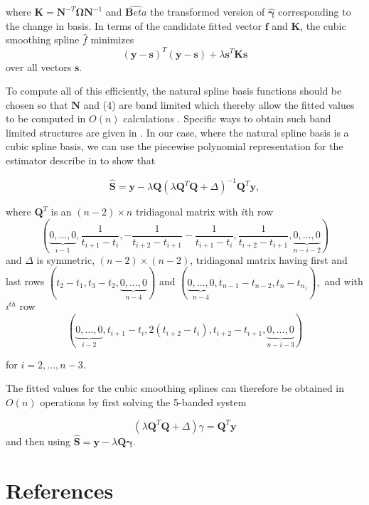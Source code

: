 \documentclass[]{book}
\begin{document}
where \(\mathbf{K} = \mathbf{N}^{-T}\mathbf{\Omega}\mathbf{N}^{-1}\) and
\(\hat{\mathbf{B}eta}\) the transformed version of \(\hat{\boldsymbol{\gamma}}\) corresponding
to the change in basis. In terms of the candidate fitted vector
\(\mathbf{f}\) and \(\mathbf{K}\), the cubic smoothing spline \(\hat{f}\)
minimizes \[(\mathbf{y}-\mathbf{s})^T(\mathbf{y}-\mathbf{s}) +
\lambda\mathbf{s}^T\mathbf{K}\mathbf{s}\] over all vectors \(\mathbf{s}\).

To compute all of this efficiently, the natural spline basis functions
should be chosen so that \(\mathbf{N}\) and (4) are band limited which
thereby allow the fitted values to be computed in \(O(n)\) calculations
\citep{eubank_nonparametric_1999}. Specific ways to obtain such band limited
structures are given in \citep{reinsch_smoothing_1967}. In our case, where
the natural spline basis is a cubic spline basis, we can use the
piecewise polynomial representation for the estimator describe in
\citep{de_boor_practical_1975} to show that

\[\hat{\mathbf{S}} = \mathbf{y} - \lambda\mathbf{Q}(\lambda\mathbf{Q}^T\mathbf{Q}+ \Delta)^{-1}\mathbf{Q}^T\mathbf{y},\]

where \(\mathbf{Q}^T\) is an \((n-2) \times n\) tridiagonal matrix with
\(\textit{i}\)th row
\[(\underbrace{0, \dots, 0}_{i-1}, \frac{1}{t_{i+1}- t_i}, -\frac{1}{t_{i+2}- t_{i+1}} - \frac{1}{t_{i+1}- t_i}, \frac{1}{t_{i+2}- t_{i+1}}, \underbrace{0,\dots,0}_{n-i-2})\]
and \(\Delta\) is symmetric, \((n-2) \times (n-2)\), tridiagonal matrix
having first and last rows
\((t_2 - t_1, t_3-t_2, \underbrace{0,\dots,0}_{n-4})\) and
\((\underbrace{0,\dots,0}_{n-4}, t_{n-1}-t_{n-2}, t_n - t_{n_1}),\) and
with \(i^{th}\) row
\[(\underbrace{0,\dots,0}_{i-2}, t_{i+1} - t_i, 2(t_{i+2}-t_i), t_{i+2}-t_{i+1}, \underbrace{0,\dots,0}_{n-i-3})\]

for \(i = 2, \dots, n-3\).

The fitted values for the cubic smoothing splines can therefore be
obtained in \(O(n)\) operations by first solving the 5-banded system

\[(\lambda\mathbf{Q}^T\mathbf{Q} + \Delta)\gamma = \mathbf{Q}^T\mathbf{y}\]
and then using \(\hat{\mathbf{S}} = \mathbf{y} - \lambda\mathbf{Q}\boldsymbol{\gamma}\).

\hypertarget{references}{%
\chapter*{References}\label{references}}


\end{document}
